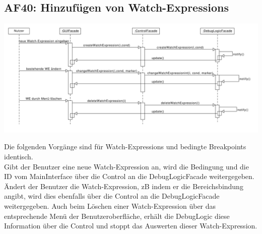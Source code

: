 \documentclass[parskip=full]{scrartcl}
\begin{document}
\subsection{AF40: Hinzufügen von Watch-Expressions}
\begin{center}
\includegraphics[width=1.0\textwidth]{diagrammIdeenUmlet/SequenceDiagrams/seq_WatchExpressionsPDF.pdf}
\end{center}
Die folgenden Vorgänge sind für Watch-Expressions und bedingte Breakpoints identisch. \\
Gibt der Benutzer eine neue Watch-Expression an, wird die Bedingung und die ID vom MainInterface über 
die Control an die DebugLogicFacade weitergegeben. Ändert der Benutzer die Watch-Expression, zB indem 
er die Bereichsbindung angibt, wird dies ebenfalls über die Control an die DebugLogicFacade weitergegeben.
Auch beim Löschen einer Watch-Expression über das entsprechende Menü der Benutzeroberfläche, erhält die
DebugLogic diese Information über die Control und stoppt das Auswerten dieser Watch-Expression.

\newpage
\end{document}
